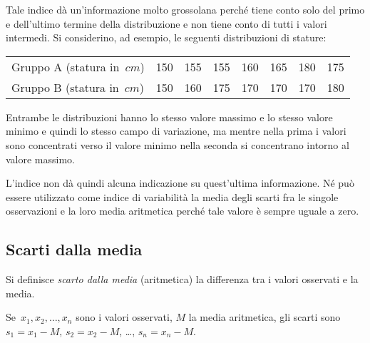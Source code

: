 \begin{esempio}

Tale indice dà un'informazione molto grossolana perché tiene conto solo del 
primo e dell'ultimo termine della
distribuzione e non tiene conto di tutti i valori intermedi. Si 
considerino, ad esempio, le seguenti distribuzioni di stature:
\begin{center}
 \begin{tabular}{lccccccc}
 \toprule
 Gruppo A (statura in~\(\unit{cm}\)) & 150 & 155 & 155 & 160 & 165 & 180 & 
175 \\
 Gruppo B (statura in~\(\unit{cm}\)) & 150 & 160 & 175 & 170 & 170 & 170 & 
180 \\
 \bottomrule
\end{tabular}
\end{center}

Entrambe le distribuzioni hanno lo stesso valore massimo e lo stesso valore 
minimo e quindi lo stesso campo di
variazione, ma mentre nella prima i valori sono concentrati verso il valore 
minimo nella seconda si concentrano intorno al valore massimo.

L'indice non dà quindi alcuna indicazione su quest'ultima informazione. Né 
può essere utilizzato come indice di
variabilità la media degli scarti fra le singole osservazioni e la loro 
media aritmetica perché tale valore è sempre uguale a zero.

\subsection{Scarti dalla media}
\label{subsec:stat02_scarti}

\begin{definizione}
Si definisce \emph{scarto dalla media} (aritmetica) la differenza tra i 
valori osservati e la media.
\end{definizione}

Se~\(x_1, x_2, \ldots, x_n\) sono i valori osservati, \(M\) la media 
aritmetica, gli scarti sono~\(s_1=x_1-M\), \(s_2=x_2-M\), \ldots, 
\(s_n=x_n-M\).
\end{esempio}

